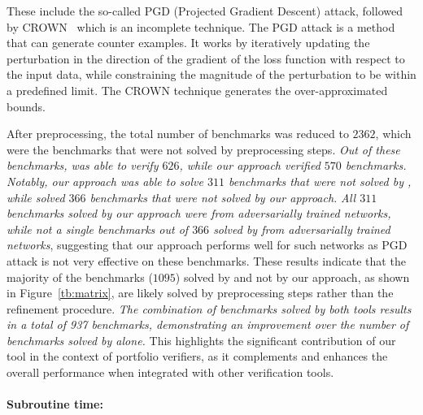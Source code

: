 These include the so-called PGD (Projected Gradient Descent) attack, followed by CROWN~\cite{zhang2018efficient} which is an incomplete technique. The PGD attack is a method that can generate counter examples. It works by iteratively updating the  perturbation in the direction of the gradient of the loss function with respect to the input data,  while constraining the magnitude of the perturbation to be within a predefined limit. The CROWN technique generates the over-approximated bounds. %

After preprocessing, the total number of benchmarks was reduced to $2362$, which were the benchmarks that were not 
solved by preprocessing steps. \textit{Out of these benchmarks, \alphabeta{} was able to verify $626$, 
while our approach verified 
$570$ benchmarks. Notably, our approach was able to solve $311$ benchmarks that were not solved by \alphabeta{}, 
while \alphabeta{} solved $366$ benchmarks that were not solved by our approach. }
\textit{All $311$ benchmarks solved by our approach were from adversarially trained networks, while 
not a single benchmarks out of $366$ solved by \alphabeta{} from adversarially trained networks}, 
suggesting that our approach performs 
well for such networks as PGD attack is not very effective on these benchmarks. 
These results indicate that the majority of the benchmarks ($1095$) solved by \alphabeta{} and not by our approach, 
as shown in Figure~\ref{tb:matrix}, are likely solved by preprocessing steps rather than the refinement procedure.
\textit{The combination of benchmarks solved by both tools results in a total of 937 benchmarks, demonstrating an improvement over the number of benchmarks solved by \alphabeta{} alone.}
This highlights the significant contribution of our tool in the context of portfolio verifiers, 
as it complements and enhances the overall performance when integrated with other verification tools.


\paragraph{Subroutine time: }



